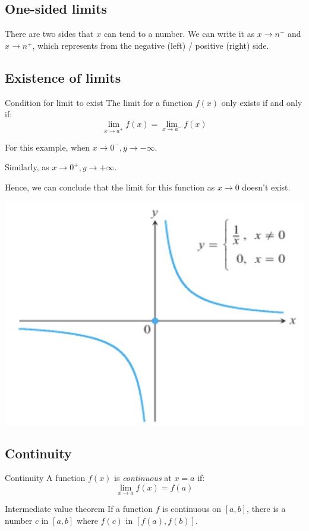 \documentclass{article}
\begin{document}
\subsection{One-sided limits}
There are two sides that $x$ can tend to a number. We can write it as $x\to n^-$ and $x\to n^+$, which represents from the negative (left) / positive (right) side.

\subsection{Existence of limits}
\begin{theorem}
  {Condition for limit to exist}
  The limit for a function $f(x)$ only exists if and only if:
  \[\lim_{x\to a^+}f(x)=\lim_{x\to a^-}f(x)\]
\end{theorem}

\begin{minipage}{0.65\textwidth}
  For this example, when $x\to 0^-, y\to -\infty$.

  Similarly, as $x\to 0^+, y\to +\infty$.

  Hence, we can conclude that the limit for this function as $x\to 0$ doesn't exist.
\end{minipage}
\hfill
\begin{minipage}{0.25\textwidth}
  \includegraphics[width=\textwidth]{img/lim3.jpg}
\end{minipage}

\subsection{Continuity}
\begin{theorem}
  {Continuity}
  A function $f(x)$ is \emph{continuous} at $x=a$ if:
  \[\mathop {\lim }\limits_{x \to a} f\left( x \right) = f\left( a \right)\]
\end{theorem}
\begin{theorem}
  {Intermediate value theorem}
  If a function $f$ is continuous on $[a, b]$, there is a number $c$ in $[a, b]$ where $f(c)$ in $[f(a), f(b)]$.
\end{theorem}
\end{document}
